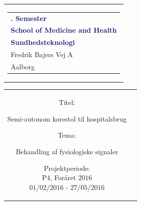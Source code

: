 % 
\thispagestyle{empty}
\begin{nopagebreak}
{\samepage 

\begin{tabular}{r}
\parbox{\textwidth}{  
\hfill \hspace{2cm} \parbox{8cm}{\begin{tabular}{l} %
{\small \textbf{\textcolor{MidnightBlue}{{$4$. Semester}}}}\\
{\small \textbf{\textcolor{MidnightBlue}{School of Medicine and Health}}}\\
{\small \textbf{\textcolor{MidnightBlue}{Sundhedsteknologi}}}\\
{\small \textcolor{NavyBlue}{Fredrik Bajers Vej $7$A}} \\
{\small \textcolor{NavyBlue}{$9220$ Aalborg}} \\
\end{tabular}}}
\end{tabular}

\begin{tabular}{cc}
\parbox{7cm}{
\begin{description}

\item {Titel:}

Semi-autonom kørestol til hospitalsbrug\\

\item {Tema:} 

\small{
Behandling af fysiologiske signaler
}

\end{description}

\parbox{8cm}{

\begin{description}
\item {Projektperiode:}\\
   P$4$, Foråret $2016$\\
   $01/02/2016$ - $27/05/2016$\\
   

\end{description}}}
\end{tabular}}
\end{nopagebreak}
